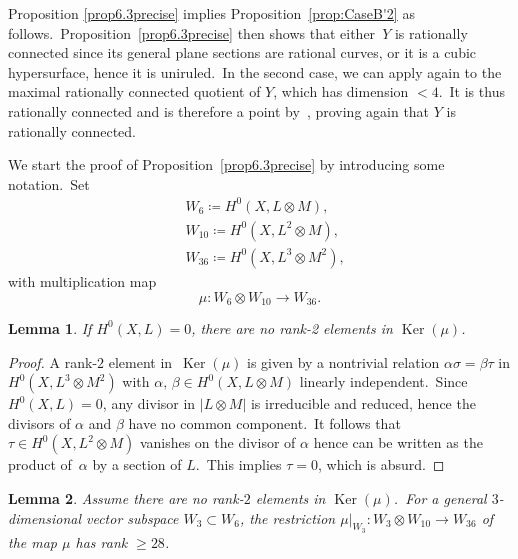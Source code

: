\documentclass[12pt]{amsart}
\DeclareMathOperator{\Ker}{Ker}
\def\otp{}
\def\lra{\longrightarrow}
\newtheorem{lemm}{Lemma}[section]
\theoremstyle{remark}
\begin{document}
Proposition \ref{prop6.3precise} implies Proposition~\ref{prop:CaseB'2} as follows.\  Proposition~\ref{prop6.3precise} then  shows that either~$Y$ is  rationally connected since  its general plane sections are rational curves, or it is  a cubic hypersurface, hence it is uniruled.\ In the second case, we can   apply \cite[Theorem~1.4]{linthese} again to the maximal rationally connected quotient of $Y$, which has dimension $<4$.\ It is thus rationally connected and is therefore a point by~\cite{GHS}, proving again that $Y$ is rationally connected.

We   start the proof of Proposition~\ref{prop6.3precise} by introducing some notation.\
Set
\begin{align*}
&W_6\coloneqq H^0(X,L\otimes M),\\
&W_{10}\coloneqq H^0(X,L^{\otp 2}\otimes M),\\
&W_{36}\coloneqq H^0(X,L^{\otp 3}\otimes  M^{\otp 2}),
\end{align*}
with multiplication map
\[
\mu\colon W_6\otimes W_{10}\lra W_{36}.
\]

\begin{lemm}\label{lem:NoRk2}
If $H^0(X,L)=0$,  there are no rank-2 elements in $\Ker(\mu)$.
\end{lemm}

\begin{proof}
A rank-$2$ element in~$\Ker(\mu)$ is given by a nontrivial relation
$\alpha\sigma=\beta \tau $ in $H^0(X,L^{\otp 3}\otimes M^{\otp 2})$ with $\alpha,\,\beta\in H^0(X,L\otimes M)$ linearly independent.\ Since $H^0(X,L)=0$, any divisor in $|L\otimes M|$ is irreducible and reduced, hence the divisors of $\alpha$ and $\beta$  have no common component.\ It follows that $\tau\in H^0(X,L^2\otimes M)$ vanishes on the divisor of $\alpha$ hence can be written as the product of~$\alpha$ by a section of $L$.\ This implies $\tau=0$, which is absurd.
\end{proof}

\begin{lemm}\label{leW6W10}
Assume there are no rank-$2$ elements in $\Ker(\mu)$.\
For a general $3$-dimensional vector subspace $W_3\subset W_6$, the restriction $\mu\vert_{W_3}\colon W_3\otimes W_{10}\to W_{36}$ of the map $\mu$ has rank $\geq 28$.
\end{lemm}
\end{document}

